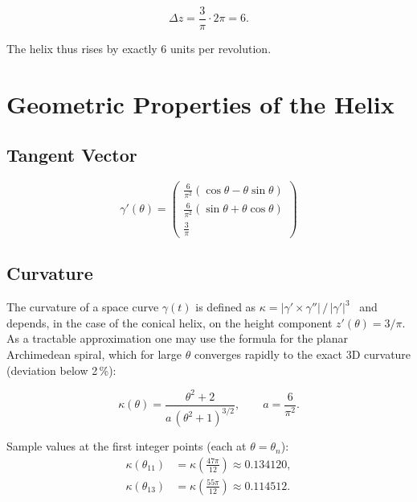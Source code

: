\begin{equation}
\Delta z = \frac{3}{\pi} \cdot 2\pi = 6.
\end{equation}

The helix thus rises by exactly 6 units per revolution.

\section{Geometric Properties of the Helix}

\subsection{Tangent Vector}

\begin{equation}
\gamma'(\theta) =
\begin{pmatrix}
\frac{6}{\pi^2}(\cos\theta - \theta\sin\theta) \\[8pt]
\frac{6}{\pi^2}(\sin\theta + \theta\cos\theta) \\[8pt]
\frac{3}{\pi}
\end{pmatrix}
\end{equation}

\subsection{Curvature}

\begin{remark}\label{rem:planar-curvature-approx}
The curvature of a space curve $\gamma(t)$ is defined as
$\kappa = |\gamma' \times \gamma''| \, / \, |\gamma'|^3$~\cite{doCarmo1976,Struik1988}
and depends, in the case of the conical helix, on the height component
$z'(\theta) = 3/\pi$. As a tractable approximation one may use the formula
for the planar Archimedean spiral, which for large $\theta$ converges
rapidly to the exact 3D curvature (deviation below 2\,\%):
\end{remark}

\begin{equation}
\kappa(\theta)
= \frac{\theta^2 + 2}{a\,(\theta^2 + 1)^{3/2}},
\qquad
a = \frac{6}{\pi^2}.
\end{equation}

Sample values at the first integer points (each at $\theta = \theta_n$):
\begin{align}
\kappa(\theta_{11}) &= \kappa\!\left(\tfrac{47\pi}{12}\right) \approx 0.134120, \\
\kappa(\theta_{13}) &= \kappa\!\left(\tfrac{55\pi}{12}\right) \approx 0.114512.
\end{align}

